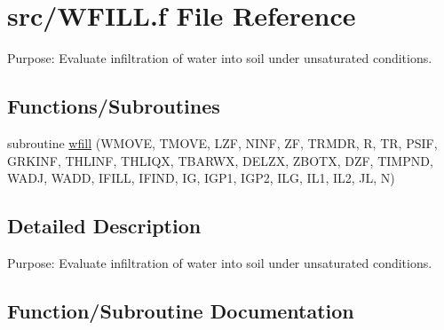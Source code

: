 \hypertarget{WFILL_8f}{}\section{src/\+W\+F\+I\+L\+L.f File Reference}
\label{WFILL_8f}


Purpose\+: Evaluate infiltration of water into soil under unsaturated conditions.  


\subsection*{Functions/\+Subroutines}
\begin{DoxyCompactItemize}
\item 
subroutine \hyperlink{WFILL_8f_a1162b1442a4411742ce29b99d59d72cc}{wfill} (W\+M\+O\+V\+E, T\+M\+O\+V\+E, L\+Z\+F, N\+I\+N\+F, Z\+F, T\+R\+M\+D\+R, R, T\+R, P\+S\+I\+F, G\+R\+K\+I\+N\+F, T\+H\+L\+I\+N\+F, T\+H\+L\+I\+Q\+X, T\+B\+A\+R\+W\+X, D\+E\+L\+Z\+X, Z\+B\+O\+T\+X, D\+Z\+F, T\+I\+M\+P\+N\+D, W\+A\+D\+J, W\+A\+D\+D, I\+F\+I\+L\+L, I\+F\+I\+N\+D, I\+G, I\+G\+P1, I\+G\+P2, I\+L\+G, I\+L1, I\+L2, J\+L, N)
\end{DoxyCompactItemize}


\subsection{Detailed Description}
Purpose\+: Evaluate infiltration of water into soil under unsaturated conditions. 



\subsection{Function/\+Subroutine Documentation}
\hypertarget{WFILL_8f_a1162b1442a4411742ce29b99d59d72cc}{}
